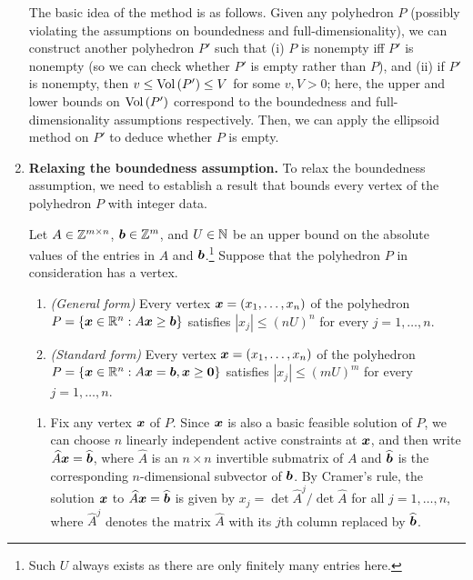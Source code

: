 \begin{enumerate}
The basic idea of the method is as follows. Given any polyhedron \(P\)
(possibly violating the assumptions on boundedness and full-dimensionality), we
can construct another polyhedron \(P'\) such that (i) \(P\) is nonempty iff
\(P'\) is nonempty (so we can check whether \(P'\) is empty rather than \(P\)),
and (ii) if \(P'\) is nonempty, then \(v\le \operatorname{Vol}\left(P'\right)\le V\) for some \(v,V>0\);
here, the upper and lower bounds on \(\operatorname{Vol}\left(P'\right)\) correspond to the boundedness
and full-dimensionality assumptions respectively. Then, we can apply the
ellipsoid method on \(P'\) to deduce whether \(P\) is empty.

\item\label{it:relax-bdd-assum} \textbf{Relaxing the boundedness assumption.}
To relax the boundedness assumption, we need to establish a result that bounds
every vertex of the polyhedron \(P\) with integer data.

\begin{proposition}
\label{prp:polyhedron-vertex-bdd}
Let \(A\in \mathbb{Z}^{m\times n}\), \(\bm{b}\in\mathbb{Z}^{m}\), and \(U\in\mathbb{N}\) be an upper
bound on the absolute values of the entries in \(A\) and
\(\bm{b}\).\footnote{Such \(U\) always exists as there are only finitely many
entries here.} Suppose that the polyhedron \(P\) in consideration has a vertex.
\begin{enumerate}
\item \emph{(General form)} Every vertex \(\bm{x}=(x_1,\dotsc,x_n)\) of the polyhedron
\(P=\{\bm{x}\in\mathbb{R}^n:A\bm{x}\ge\bm{b}\}\) satisfies \(|x_j|\le (nU)^{n}\)
for every \(j=1,\dotsc,n\).
\item \emph{(Standard form)} Every vertex \(\bm{x}=(x_1,\dotsc,x_n)\) of the polyhedron
\(P=\{\bm{x}\in\mathbb{R}^n:A\bm{x}=\bm{b}, \bm{x}\ge\bm{0}\}\) satisfies
\(|x_j|\le (mU)^{m}\) for every \(j=1,\dotsc,n\).
\end{enumerate}
\end{proposition}
\begin{pf}
\begin{enumerate}
\item Fix any vertex \(\bm{x}\) of \(P\). Since \(\bm{x}\) is also a basic
feasible solution of \(P\), we can choose \(n\) linearly independent active
constraints at \(\bm{x}\), and then write
\(\widehat{A}\bm{x}=\widehat{\bm{b}}\), where \(\widehat{A}\) is an
\(n\times n\) invertible submatrix of \(A\) and \(\widehat{\bm{b}}\) is the
corresponding \(n\)-dimensional subvector of \(\bm{b}\). By Cramer's rule,
the solution \(\bm{x}\) to \(\widehat{A}\bm{x}=\widehat{\bm{b}}\) is given by
\(x_j=\det\widehat{A}^{j}/\det\widehat{A}\) for all \(j=1,\dotsc,n\), where
\(\widehat{A}^{j}\) denotes the matrix \(\widehat{A}\) with its \(j\)th column
replaced by \(\widehat{\bm{b}}\).


\end{enumerate}
\end{pf}
\end{enumerate}

